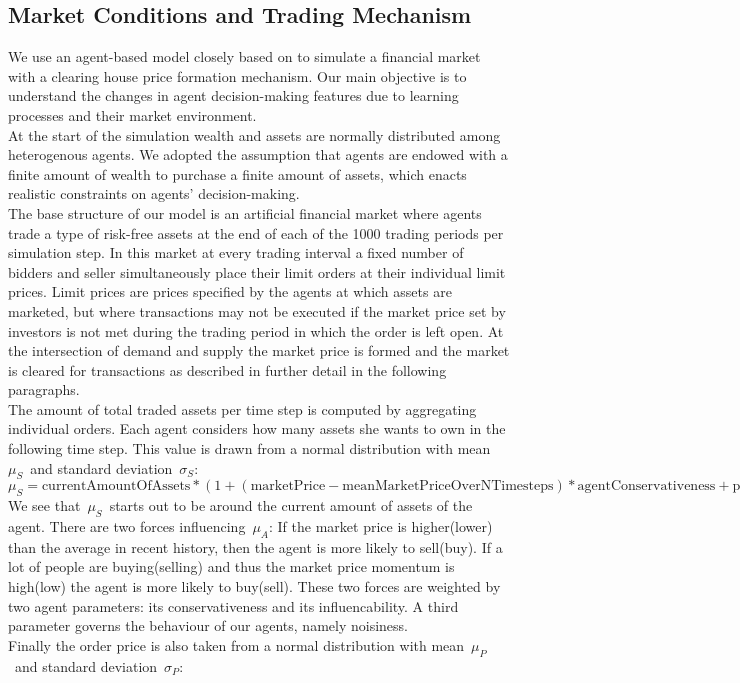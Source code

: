 \documentclass[11pt]{article}
\begin{document}
\subsection{Market Conditions and Trading Mechanism}
We use an agent-based model closely based on \citet{raberto2001agent} to simulate a financial market with a clearing house price formation mechanism. Our main objective is to understand the changes in agent decision-making features due to learning processes and their market environment. \\
At the start of the simulation wealth and assets are normally distributed among heterogenous agents. We adopted the assumption that agents are endowed with a finite amount of wealth to purchase a finite amount of assets, which enacts realistic constraints on agents' decision-making. \\
The base structure of our model is an artificial financial market where agents trade a type of risk-free assets at the end of each of the 1000 trading periods per simulation step. In this market at every trading interval a fixed number of bidders and seller simultaneously place their limit orders at their individual limit prices. Limit prices are prices specified by the agents at which assets are marketed, but where transactions may not be executed if the market price set by investors is not met during the trading period in which the order is left open. At the intersection of demand and supply the market price is formed and the market is cleared for transactions as described in further detail in the following paragraphs. \\
The amount of total traded assets per time step is computed by aggregating individual orders. Each agent considers how many assets she wants to own in the following time step. This value is drawn from a normal distribution with mean $\mu_S$ and standard deviation $\sigma_S$:
\begin{equation}
\mu_S = \text{currentAmountOfAssets} * (1 + (\text{marketPrice} - \text{meanMarketPriceOverNTimesteps}) * \text{agentConservativeness} + \text{priceMomentum} * \text{agentInfluencability}, \sigma_S = \text{agentNoisiness})
\end{equation}
We see that $\mu_S$ starts out to be around the current amount of assets of the agent. There are two forces influencing $\mu_A$: If the market price is higher(lower) than the average in recent history, then the agent is more likely to sell(buy). If a lot of people are buying(selling) and thus the market price momentum is high(low) the agent is more likely to buy(sell). These two forces are weighted by two agent parameters: its conservativeness and its influencability. A third parameter governs the behaviour of our agents, namely  noisiness.\\
Finally the order price is also taken from a normal distribution with mean $\mu_P$ and standard deviation $\sigma_P$:
\end{document}
